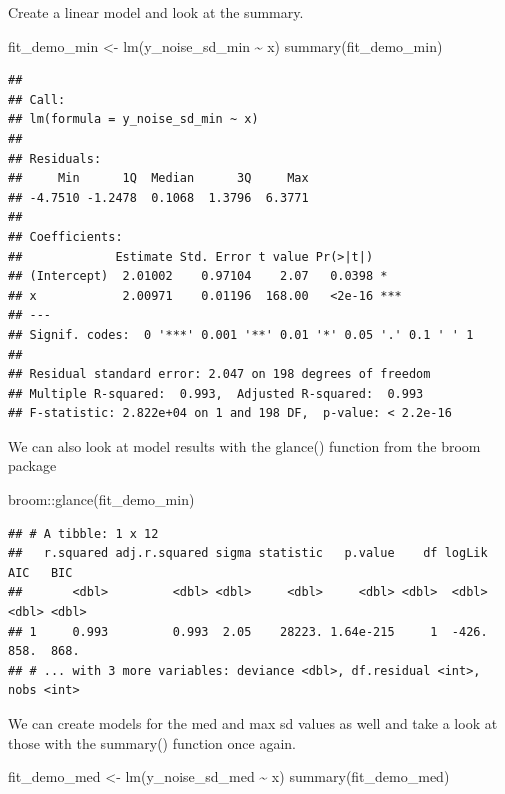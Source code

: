\documentclass[
]{book}
\newenvironment{Shaded}{\begin{snugshade}}{\end{snugshade}}
\newcommand{\FunctionTok}[1]{\textcolor[rgb]{0.00,0.00,0.00}{#1}}
\newcommand{\NormalTok}[1]{#1}
\newcommand{\OtherTok}[1]{\textcolor[rgb]{0.56,0.35,0.01}{#1}}
\newcommand{\SpecialCharTok}[1]{\textcolor[rgb]{0.00,0.00,0.00}{#1}}
\begin{document}
Create a linear model and look at the summary.

\begin{Shaded}
\begin{Highlighting}[]
\NormalTok{fit\_demo\_min }\OtherTok{\textless{}{-}} \FunctionTok{lm}\NormalTok{(y\_noise\_sd\_min }\SpecialCharTok{\textasciitilde{}}\NormalTok{ x)}
\FunctionTok{summary}\NormalTok{(fit\_demo\_min)}
\end{Highlighting}
\end{Shaded}

\begin{verbatim}
## 
## Call:
## lm(formula = y_noise_sd_min ~ x)
## 
## Residuals:
##     Min      1Q  Median      3Q     Max 
## -4.7510 -1.2478  0.1068  1.3796  6.3771 
## 
## Coefficients:
##             Estimate Std. Error t value Pr(>|t|)    
## (Intercept)  2.01002    0.97104    2.07   0.0398 *  
## x            2.00971    0.01196  168.00   <2e-16 ***
## ---
## Signif. codes:  0 '***' 0.001 '**' 0.01 '*' 0.05 '.' 0.1 ' ' 1
## 
## Residual standard error: 2.047 on 198 degrees of freedom
## Multiple R-squared:  0.993,  Adjusted R-squared:  0.993 
## F-statistic: 2.822e+04 on 1 and 198 DF,  p-value: < 2.2e-16
\end{verbatim}

We can also look at model results with the glance() function from the broom package

\begin{Shaded}
\begin{Highlighting}[]
\NormalTok{broom}\SpecialCharTok{::}\FunctionTok{glance}\NormalTok{(fit\_demo\_min)}
\end{Highlighting}
\end{Shaded}

\begin{verbatim}
## # A tibble: 1 x 12
##   r.squared adj.r.squared sigma statistic   p.value    df logLik   AIC   BIC
##       <dbl>         <dbl> <dbl>     <dbl>     <dbl> <dbl>  <dbl> <dbl> <dbl>
## 1     0.993         0.993  2.05    28223. 1.64e-215     1  -426.  858.  868.
## # ... with 3 more variables: deviance <dbl>, df.residual <int>, nobs <int>
\end{verbatim}

We can create models for the med and max sd values as well and take a look at those with the summary() function once again.

\begin{Shaded}
\begin{Highlighting}[]
\NormalTok{fit\_demo\_med }\OtherTok{\textless{}{-}} \FunctionTok{lm}\NormalTok{(y\_noise\_sd\_med }\SpecialCharTok{\textasciitilde{}}\NormalTok{ x)}
\FunctionTok{summary}\NormalTok{(fit\_demo\_med)}
\end{Highlighting}
\end{Shaded}
\end{document}
